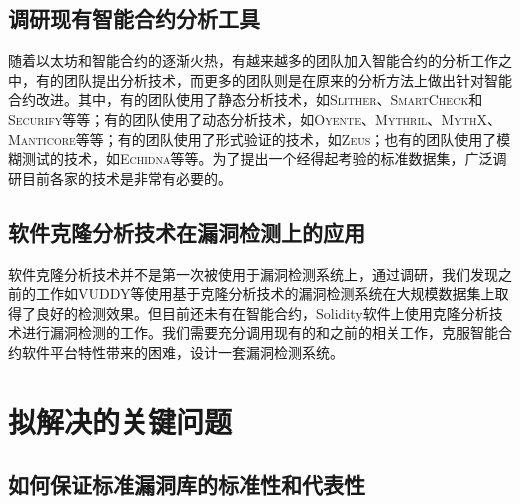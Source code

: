 \subsection{调研现有智能合约分析工具}

随着以太坊和智能合约的逐渐火热，有越来越多的团队加入智能合约的分析工作之中，有的团队提出分析技术，而更多的团队则是在原来的分析方法上做出针对智能合约改进。其中，有的团队使用了静态分析技术，如\textsc{Slither}\cite{slither}、\textsc{SmartCheck}\cite{smartcheck}和\textsc{Securify}\cite{securify}等等；有的团队使用了动态分析技术，如\textsc{Oyente}\cite{oyente}、\textsc{Mythril}\cite{mythril}、\textsc{MythX}\cite{mythx}、\textsc{Manticore}\cite{manticore}等等；有的团队使用了形式验证的技术，如\textsc{Zeus}\cite{zeus}；也有的团队使用了模糊测试的技术，如\textsc{Echidna}\cite{echidna}等等。为了提出一个经得起考验的标准数据集，广泛调研目前各家的技术是非常有必要的。

%

\subsection{软件克隆分析技术在漏洞检测上的应用}

软件克隆分析技术并不是第一次被使用于漏洞检测系统上，通过调研，我们发现之前的工作如VUDDY\cite{vuddy}等使用基于克隆分析技术的漏洞检测系统在大规模数据集上取得了良好的检测效果。但目前还未有在智能合约，Solidity软件上使用克隆分析技术进行漏洞检测的工作。我们需要充分调用现有的和之前的相关工作，克服智能合约软件平台特性带来的困难，设计一套漏洞检测系统。

\section{拟解决的关键问题}

\subsection{如何保证标准漏洞库的标准性和代表性}


